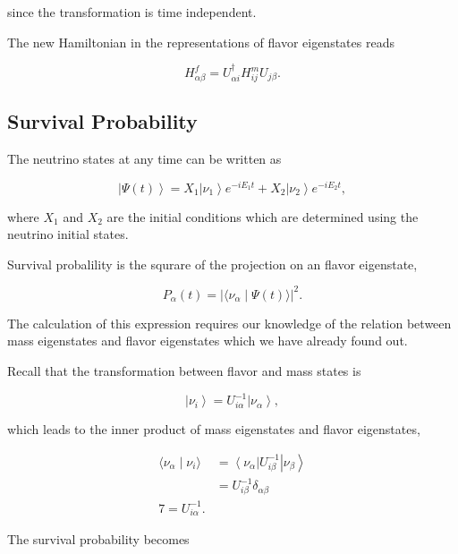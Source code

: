 \documentclass{tufte-handout}
\newcommand{\bra}[1]{\left\langle #1\right|}
\newcommand{\ket}[1]{\left| #1\right\rangle}
\newcommand{\braket}[2]{\langle #1 \mid #2 \rangle}
\begin{document}
since the transformation is time independent.

The new Hamiltonian in the representations of flavor eigenstates reads

\begin{equation}
H^f_{\alpha\beta}  = U^\dagger_{\alpha i} H^m_{ij} U_{j\beta}.
\end{equation}



\subsection{Survival Probability}


The neutrino states at any time can be written as

\begin{equation}
\ket{\Psi(t)}  = X_1 \ket{\nu_1 } e^{-i E_1 t}+ X_2 \ket{ \nu_2 } e^{-i E_2 t},
\end{equation}

where $X_1$ and $X_2$ are the initial conditions which are determined using the neutrino initial states.

Survival probalility is the squrare of the projection on an flavor eigenstate,

\begin{equation}
P_{\alpha}(t) = \lvert \braket{\nu_{\alpha}}{\Psi(t)} \rvert^2.
\end{equation}

The calculation of this expression requires our knowledge of the relation between mass eigenstates and flavor eigenstates which we have already found out.

Recall that the transformation between flavor and mass states is

\begin{equation}
\ket{\nu_i} = U^{-1}_{i\alpha} \ket{\nu_\alpha},
\end{equation}

which leads to the inner product of mass eigenstates and flavor eigenstates,

\begin{align}
\braket{\nu_\alpha}{\nu_i} &= \bra{\nu_\alpha} U^{-1}_{i\beta} \ket{\nu_\beta} \\
& = U^{-1}_{i\beta}\delta_{\alpha\beta} \\
7 = U^{-1}_{i\alpha}.
\end{align}


The survival probability becomes
\end{document}
